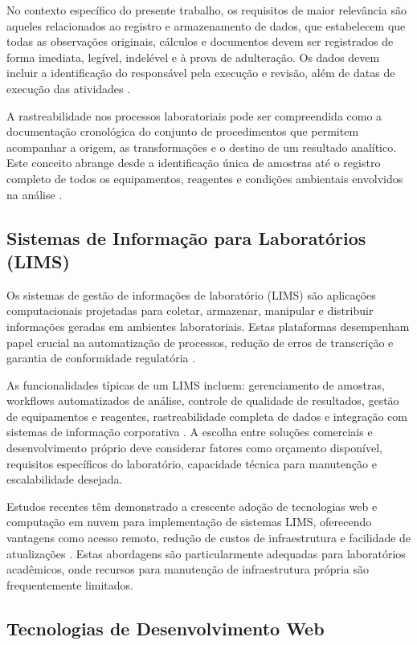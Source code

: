 \documentclass[12pt,a4paper]{article}
\providecommand\关键字[1]{\textbf{#1}}
\begin{document}
No contexto específico do presente trabalho, os requisitos de maior relevância são aqueles relacionados ao registro e armazenamento de dados, que estabelecem que todas as observações originais, cálculos e documentos devem ser registrados de forma imediata, legível, indelével e à prova de adulteração. Os dados devem incluir a identificação do responsável pela execução e revisão, além de datas de execução das atividades \cite{iso2017}.

A rastreabilidade nos processos laboratoriais pode ser compreendida como a documentação cronológica do conjunto de procedimentos que permitem acompanhar a origem, as transformações e o destino de um resultado analítico. Este conceito abrange desde a identificação única de amostras até o registro completo de todos os equipamentos, reagentes e condições ambientais envolvidos na análise \cite{inmetro2018}.

\subsection{Sistemas de Informação para Laboratórios (LIMS)}

Os sistemas de gestão de informações de laboratório (LIMS) são aplicações computacionais projetadas para coletar, armazenar, manipular e distribuir informações geradas em ambientes laboratoriais. Estas plataformas desempenham papel crucial na automatização de processos, redução de erros de transcrição e garantia de conformidade regulatória \cite{allison2015}.

As funcionalidades típicas de um LIMS incluem: gerenciamento de amostras, workflows automatizados de análise, controle de qualidade de resultados, gestão de equipamentos e reagentes, rastreabilidade completa de dados e integração com sistemas de informação corporativa \cite{wang2018}. A escolha entre soluções comerciais e desenvolvimento próprio deve considerar fatores como orçamento disponível, requisitos específicos do laboratório, capacidade técnica para manutenção e escalabilidade desejada.

Estudos recentes têm demonstrado a crescente adoção de tecnologias web e computação em nuvem para implementação de sistemas LIMS, oferecendo vantagens como acesso remoto, redução de custos de infraestrutura e facilidade de atualizações \cite{morales2019}. Estas abordagens são particularmente adequadas para laboratórios acadêmicos, onde recursos para manutenção de infraestrutura própria são frequentemente limitados.

\subsection{Tecnologias de Desenvolvimento Web}
\end{document}

